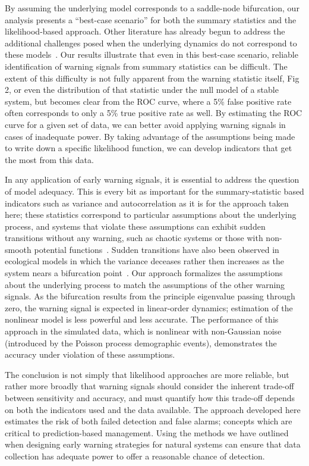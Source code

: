 \documentclass[authoryear,review,11pt]{elsarticle}
\begin{document}
By assuming the underlying model corresponds to a saddle-node bifurcation,
our analysis presents a ``best-case scenario'' for both the summary statistics and the likelihood-based approach. 
Other literature has already begun to address the additional challenges posed when the underlying 
dynamics do not correspond to these models~\citep{Hastings2010}.
Our results illustrate that even in this best-case scenario, 
reliable identification of warning signals from summary statistics can be difficult.  
The extent of this difficulty is not fully apparent from the warning statistic itself, Fig 2,
or even the distribution of that statistic under the null model of a stable system, 
but becomes clear from the ROC curve, where a 5\% false positive rate often corresponds to only a 5\% true positive rate as well.  
By estimating the ROC curve for a given set of data, 
we can better avoid applying warning signals in cases of inadequate power.
By taking advantage of the assumptions being made to write down a specific likelihood function,
we can develop indicators that get the most from this data.  


In any application of early warning signals, it is essential to address the question of model adequacy.  
This is every bit as important for the summary-statistic based indicators such as variance and autocorrelation
as it is for the approach taken here; these statistics correspond to particular assumptions about the underlying process,
and systems that violate these assumptions can exhibit sudden transitions without any warning,
such as chaotic systems or those with non-smooth potential functions~\citep{Hastings2010}.
Sudden transitions have also been observed in ecological models in which 
the variance deceases rather then increases as the system nears a bifurcation point~\citep{Schreiber2003, Schreiber2008, Dakos2011a}.  
Our approach formalizes the assumptions about the underlying process to match the assumptions of the other warning signals.  
As the bifurcation results from the principle eigenvalue passing through zero, 
the warning signal is expected in linear-order dynamics;
estimation of the nonlinear model is less powerful and less accurate.  
The performance of this approach in the simulated data, which is nonlinear with non-Gaussian noise 
(introduced by the Poisson process demographic events), 
demonstrates the accuracy under violation of these assumptions.  


The conclusion is not simply that likelihood approaches are more reliable, 
but rather more broadly that warning signals should consider
the inherent trade-off between sensitivity and accuracy,
and must quantify how this trade-off depends on both the indicators used and the data available.  
The approach developed here estimates the risk of both failed detection and false alarms;
concepts which are critical to prediction-based management.  
Using the methods we have outlined when designing early warning strategies for natural systems
can ensure that data collection has adequate power to offer a reasonable chance of detection. 
\end{document}
